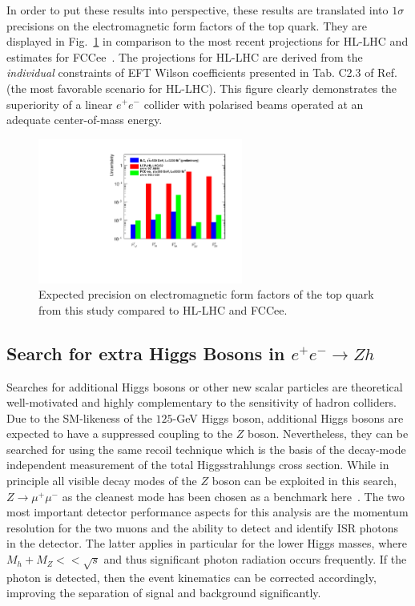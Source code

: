 In order to put these results into perspective, these results are translated into $1\sigma$ precisions on the electromagnetic form factors of the top quark. They are displayed in Fig.~\ref{fig:ttbar:formfac} in comparison to the most recent projections for HL-LHC and estimates for FCCee~\cite{Janot:2015yza}. The projections for HL-LHC are derived from the {\em individual} constraints of EFT Wilson coefficients presented in Tab. C2.3 of Ref.~\cite{Durieux:2019rbz} (the most favorable scenario for HL-LHC). This figure clearly demonstrates the superiority of a linear $e^+e^-$ collider with polarised beams operated at an adequate center-of-mass energy.             
\begin{figure}[htbp]
\begin{center} \includegraphics[width=0.6\textwidth]{Performance/fig/couplall.pdf}
\end{center}
\caption{Expected precision on electromagnetic form factors of the top quark from this study compared to HL-LHC and FCCee.}
\label{fig:ttbar:formfac}
\end{figure}

\subsection{Search for extra Higgs Bosons in \texorpdfstring{$e^+e^- \to Zh$}{e+e- -> Zh}}
\label{subsec:bench:extraH}

Searches for additional Higgs bosons or other new scalar particles are theoretical well-motivated and highly
complementary to the sensitivity of hadron colliders. Due to the SM-likeness of the $125$-GeV Higgs boson, 
additional Higgs bosons are expected to have a suppressed coupling to the $Z$ boson. Nevertheless, they can 
be searched for using the same recoil technique which is the basis of the decay-mode independent measurement
of the total Higgsstrahlungs cross section. While in principle all visible decay modes of the $Z$ boson can
be exploited in this search, $Z\to\mu^+\mu^-$ as the cleanest mode has been chosen as a benchmark here~\cite{ILDNote:extraH}.
The two most important detector performance aspects for this analysis are the momentum resolution for the two
muons and the ability to detect and identify ISR photons in the detector. The latter applies in particular for the lower Higgs masses, where $M_h + M_Z << \sqrt{s}$ and thus significant photon radiation occurs frequently.
If the photon is detected, then the event kinematics can be corrected accordingly, improving the separation of signal and background significantly.


